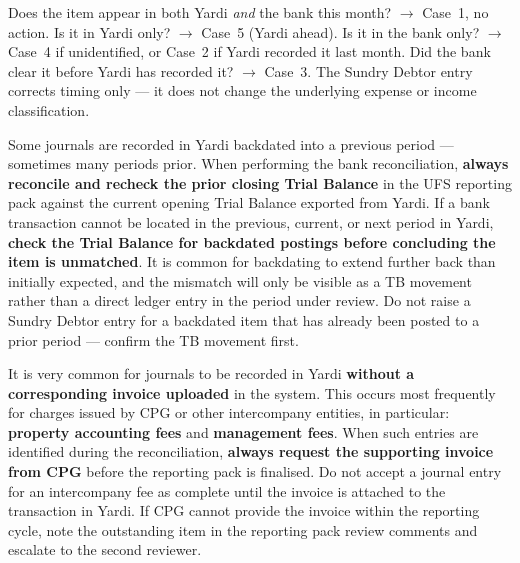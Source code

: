 \documentclass[10pt,a4paper]{article}
\begin{document}
\begin{note}
Does the item appear in both Yardi \emph{and} the bank this month? $\to$ Case~1, no action. Is it in Yardi only? $\to$ Case~5 (Yardi ahead). Is it in the bank only? $\to$ Case~4 if unidentified, or Case~2 if Yardi recorded it last month. Did the bank clear it before Yardi has recorded it? $\to$ Case~3. The Sundry Debtor entry corrects timing only --- it does not change the underlying expense or income classification.
\end{note}

\begin{importantnote}
Some journals are recorded in Yardi backdated into a previous period --- sometimes many periods prior. When performing the bank reconciliation, \textbf{always reconcile and recheck the prior closing Trial Balance} in the UFS reporting pack against the current opening Trial Balance exported from Yardi. If a bank transaction cannot be located in the previous, current, or next period in Yardi, \textbf{check the Trial Balance for backdated postings before concluding the item is unmatched}. It is common for backdating to extend further back than initially expected, and the mismatch will only be visible as a TB movement rather than a direct ledger entry in the period under review. Do not raise a Sundry Debtor entry for a backdated item that has already been posted to a prior period --- confirm the TB movement first.
\end{importantnote}

\begin{importantnote}
It is very common for journals to be recorded in Yardi \textbf{without a corresponding invoice uploaded} in the system. This occurs most frequently for charges issued by CPG or other intercompany entities, in particular: \textbf{property accounting fees} and \textbf{management fees}. When such entries are identified during the reconciliation, \textbf{always request the supporting invoice from CPG} before the reporting pack is finalised. Do not accept a journal entry for an intercompany fee as complete until the invoice is attached to the transaction in Yardi. If CPG cannot provide the invoice within the reporting cycle, note the outstanding item in the reporting pack review comments and escalate to the second reviewer.
\end{importantnote}
\end{document}
